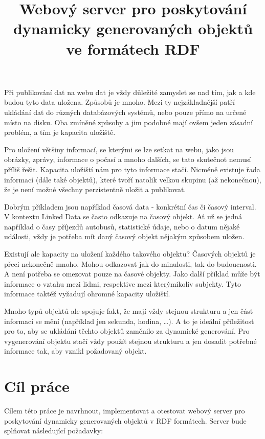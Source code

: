 \documentclass[thesis=B,czech]{FITthesis}[2012/06/26]
\title{Webový server pro poskytování dynamicky generovaných objektů ve formátech RDF}
\begin{document}

\begin{introduction}
\paragraph{}
Při publikování dat na webu dat je vždy důležité zamyslet se nad tím, jak a kde budou tyto data uložena.
Způsobů je mnoho. Mezi ty nejzákladnější patří ukládání dat do různých databázových systémů, nebo pouze přímo na určené místo na disku.
Oba zmíněné způsoby a jim podobné mají ovšem jeden zásadní problém, a tím je kapacita uložiště.

Pro uložení většiny informací, se kterými se lze setkat na webu, jako jsou obrázky, zprávy, informace o počasí a mnoho dalších, se tato skutečnot nemusí příliš řešit.
Kapacita uložiští nám pro tyto informace stačí. Nicméně existuje řada informací (dále také objektů), které tvoří natolik velkou skupinu (až nekonečnou),
že je není možné všechny perzistentně uložit a publikovat.

Dobrým příkladem jsou například časová data - konkrétní čas či časový interval. V kontextu Linked Data \cite{linked_data} se často odkazuje na časový objekt.
Ať už se jedná například o časy příjezdů autobusů, statistické údaje,
nebo o datum nějaké události, vždy je potřeba mít daný časový objekt nějakým způsobem uložen.

Existují ale kapacity na uložení každého takového objektu? Časových objektů je přeci nekonečně mnoho. Mohou odkazovat jak do minulosti, tak do budoucnosti.
A není potřeba se omezovat pouze na časové objekty. Jako další příklad může být informace o vztahu mezi lidmi, respektive mezi kterýmikoliv subjekty.
Tyto informace taktéž vyžadují ohromné kapacity uložiští.

Mnoho typů objektů ale spojuje fakt, že mají vždy stejnou strukturu a jen část informací se mění (například jen sekunda, hodina, \ldots).
A to je ideální příležitost pro to, aby se ukládání těchto objektů zaměnilo za dynamické generování. Pro vygenerování objektu stačí vždy použít stejnou strukturu
a jen dosadit potřebné informace tak, aby vznikl požadovaný objekt.

\end{introduction}

\chapter{Cíl práce}
Cílem této práce je navrhnout, implementovat a otestovat webový server pro poskytování dynamicky generovaných objektů v RDF formátech.
Server bude splňovat následující požadavky:
\end{document}
